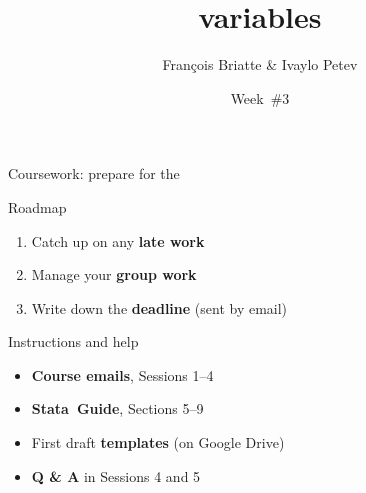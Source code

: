 \documentclass[t]{beamer}
\title{variables}
\author{François Briatte \& Ivaylo Petev}
\date{Week~\#3}
\begin{document}

	\begin{frame}[t]{Coursework: prepare for the }

    \begin{block}{Roadmap}
      \begin{enumerate}
        \item Catch up on any \textbf{late work}
        \item Manage your \textbf{group work}
        \item Write down the \textbf{deadline} (sent by email)
      \end{enumerate}
    \end{block}

    \begin{block}{Instructions and help}
      \begin{itemize}
	      \item \textbf{Course emails}, Sessions 1--4
        \item \textbf{Stata~Guide}, Sections 5--9%
        \item First draft \textbf{templates} (on Google Drive)
        \item \textbf{Q \& A} in Sessions 4 and 5
      \end{itemize}
    \end{block}
    		
	\end{frame}
\end{document}
